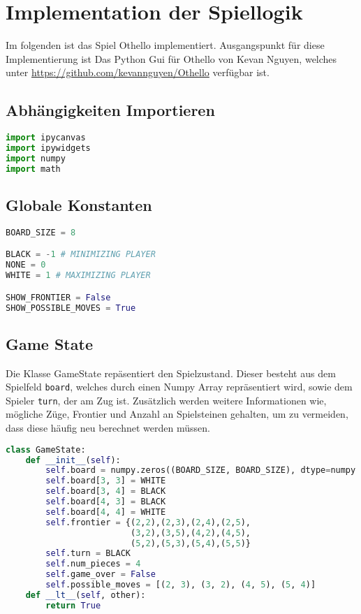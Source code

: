 \hypertarget{implementation-der-spiellogik}{%
\section{Implementation der
Spiellogik}\label{implementation-der-spiellogik}}

Im folgenden ist das Spiel Othello implementiert. Ausgangspunkt für
diese Implementierung ist Das Python Gui für Othello von Kevan Nguyen,
welches unter \url{https://github.com/kevannguyen/Othello} verfügbar
ist.

\hypertarget{abhuxe4ngigkeiten-importieren}{%
\subsection{Abhängigkeiten
Importieren}\label{abhuxe4ngigkeiten-importieren}}

\begin{lstlisting}[language=Python]
import ipycanvas
import ipywidgets
import numpy
import math
\end{lstlisting}

\hypertarget{globale-konstanten}{%
\subsection{Globale Konstanten}\label{globale-konstanten}}

\begin{lstlisting}[language=Python]
BOARD_SIZE = 8

BLACK = -1 # MINIMIZING PLAYER
NONE = 0
WHITE = 1 # MAXIMIZING PLAYER

SHOW_FRONTIER = False
SHOW_POSSIBLE_MOVES = True
\end{lstlisting}

\hypertarget{game-state}{%
\subsection{Game State}\label{game-state}}

Die Klasse GameState repäsentiert den Spielzustand. Dieser besteht aus
dem Spielfeld \passthrough{\lstinline!board!}, welches durch einen Numpy
Array repräsentiert wird, sowie dem Spieler
\passthrough{\lstinline!turn!}, der am Zug ist. Zusätzlich werden
weitere Informationen wie, mögliche Züge, Frontier und Anzahl an
Spielsteinen gehalten, um zu vermeiden, dass diese häufig neu berechnet
werden müssen.

\begin{lstlisting}[language=Python]
class GameState:
    def __init__(self):
        self.board = numpy.zeros((BOARD_SIZE, BOARD_SIZE), dtype=numpy.int8)
        self.board[3, 3] = WHITE
        self.board[3, 4] = BLACK
        self.board[4, 3] = BLACK
        self.board[4, 4] = WHITE
        self.frontier = {(2,2),(2,3),(2,4),(2,5),
                         (3,2),(3,5),(4,2),(4,5),
                         (5,2),(5,3),(5,4),(5,5)}
        self.turn = BLACK
        self.num_pieces = 4
        self.game_over = False
        self.possible_moves = [(2, 3), (3, 2), (4, 5), (5, 4)]
    def __lt__(self, other):
        return True
\end{lstlisting}

